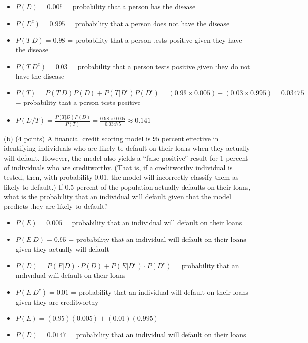 \documentclass{article}
\begin{document}
\begin{itemize}
    \item \(P(D) = 0.005\) = probability that a person has the disease
    \item \(P(D^c) = 0.995\) = probability that a person does not have the disease
    \item \(P(T|D) = 0.98\) = probability that a person tests positive given they have the disease
    \item \(P(T|D^c) = 0.03\) = probability that a person tests positive given they do not have the disease
    \item \(P(T) = P(T|D)P(D) + P(T|D^c)P(D^c) = (0.98 \times 0.005) + (0.03 \times 0.995) = 0.03475\) = probability that a person tests positive
    \item \(P(D/T) = \frac{P(T|D)P(D)}{P(T)} = \frac{0.98 \times 0.005}{0.03475} \approx 0.141\)
\end{itemize}


(b) (4 points) A financial credit scoring model is 95 percent effective in identifying individuals who
are likely to default on their loans when they actually will default. However, the model also yields a
“false positive” result for 1 percent of individuals who are creditworthy. (That is, if a creditworthy
individual is tested, then, with probability 0.01, the model will incorrectly classify them as likely
to default.) If 0.5 percent of the population actually defaults on their loans, what is the probability
that an individual will default given that the model predicts they are likely to default?

\begin{itemize}
    \item \(P(E) = 0.005\) = probability that an individual will default on their loans
    \item \(P(E|D) = 0.95\) = probability that an individual will default on their loans given they actually will default
    \item \(P(D) = P(E|D) \cdot P(D) + P(E|D^c) \cdot P(D^c)\) = probability that an individual will default on their loans
    \item \(P(E|D^c) = 0.01\) = probability that an individual will default on their loans given they are creditworthy
    \item \(P(E) = (0.95)(0.005) + (0.01)(0.995)\)
    \item \(P(D) = 0.0147\) = probability that an individual will default on their loans
\end{itemize}
\end{document}

